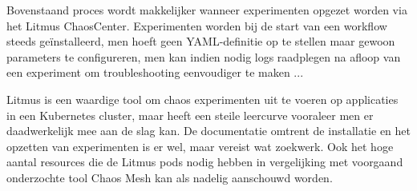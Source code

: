 Bovenstaand proces wordt makkelijker wanneer experimenten opgezet worden via het Litmus ChaosCenter. Experimenten worden bij de start van een workflow steeds geïnstalleerd, men hoeft geen YAML-definitie op te stellen maar gewoon parameters te configureren, men kan indien nodig logs raadplegen na afloop van een experiment om troubleshooting eenvoudiger te maken ...

Litmus is een waardige tool om chaos experimenten uit te voeren op applicaties in een Kubernetes cluster, maar heeft een steile leercurve vooraleer men er daadwerkelijk mee aan de slag kan. De documentatie omtrent de installatie en het opzetten van experimenten is er wel, maar vereist wat zoekwerk. Ook het hoge aantal resources die de Litmus pods nodig hebben in vergelijking met voorgaand onderzochte tool Chaos Mesh kan als nadelig aanschouwd worden.